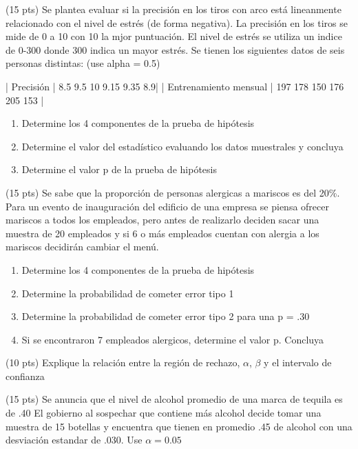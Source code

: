 \documentclass[addpoints]{exam}
\theoremstyle{mytheor}
\begin{document}
  \begin{questions} 
  
  \question (15 pts) Se plantea evaluar si la precisión en los tiros con arco está lineanmente relacionado con el nivel de estrés (de forma negativa). La precisión en los tiros se mide de 0 a 10 con 10 la mjor puntuación. El nivel de estrés se utiliza un indice de 0-300 donde 300 indica un mayor estrés. Se tienen los siguientes datos de seis personas distintas: (use alpha = 0.5)
  
| Precisión | 8.5 9.5 10 9.15 9.35 8.9|
| Entrenamiento mensual | 197 178 150 176 205 153 |
  
  \begin{enumerate}
  \item Determine los 4 componentes de la prueba de hipótesis
  \item Determine el valor del estadístico evaluando los datos muestrales y concluya
  \item Determine el valor p de la prueba de hipótesis
  \end{enumerate}
  
  \question (15 pts) Se sabe que la proporción de personas alergicas a mariscos es del 20\%. Para un evento de inauguración del edificio de una empresa se piensa ofrecer mariscos a todos los empleados, pero antes de realizarlo deciden sacar una muestra de 20 empleados y si 6 o más empleados cuentan con alergia a los mariscos decidirán cambiar el menú. 
  
\begin{enumerate}
  \item Determine los 4 componentes de la prueba de hipótesis
  \item Determine la probabilidad de cometer error tipo 1
  \item Determine la probabilidad de cometer error tipo 2 para una p = .30 
  \item Si se encontraron 7 empleados alergicos, determine el valor p. Concluya
\end{enumerate}
  
  \question (10 pts) Explique la relación entre la región de rechazo, $\alpha$, $\beta$ y el intervalo de confianza
  

\question (15 pts) Se anuncia que el nivel de alcohol promedio de una marca de tequila es de .40 El gobierno al sospechar que contiene más alcohol decide tomar una muestra de 15 botellas y encuentra que tienen en promedio .45 de alcohol con una desviación estandar de .030. Use $\alpha = 0.05$


\end{questions}
\end{document}
